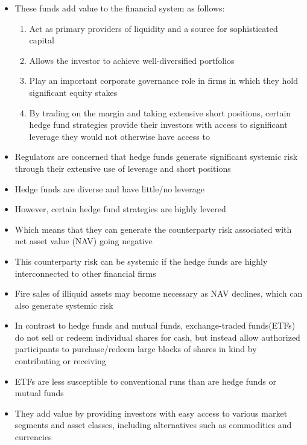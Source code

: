 \documentclass[11pt]{beamer}
\begin{document}
\begin{frame}
\begin{itemize}
\item These funds add value to the financial system as follows:
\begin{enumerate}
\item Act as primary providers of liquidity and a source for sophisticated capital
\item Allows the investor to achieve well-diversified portfolios
\item Play an important corporate governance role in firms in which they hold significant equity stakes
\item By trading on the margin and taking extensive short positions,
certain hedge fund strategies provide their investors with access to significant leverage they would not otherwise have access to
\end{enumerate}
\end{itemize}
\end{frame}

\begin{frame}
\begin{itemize}
\item Regulators are concerned that hedge funds generate significant systemic risk through their extensive use of leverage and short positions
\item Hedge funds are diverse and have little/no leverage
\item However, certain hedge fund strategies are highly levered
\item Which means that they can generate the counterparty risk associated with net asset value (NAV) going negative
\item This counterparty risk can be systemic if the hedge funds are highly interconnected to other financial firms
\item Fire sales of illiquid assets may become necessary as NAV declines, which can also generate systemic risk
\end{itemize}
\end{frame}

\begin{frame}
\begin{itemize}
\item In contrast to hedge funds and mutual funds, exchange-traded funds(ETFs) do not sell or redeem individual shares for cash, but instead allow authorized participants to purchase/redeem large blocks of shares in kind by contributing or receiving
\item ETFs are less susceptible to conventional runs than are hedge funds or mutual funds
\item They add value by providing investors with easy access to various market segments and asset classes, including alternatives such as commodities and currencies
\end{itemize}
\end{frame}
\end{document}
